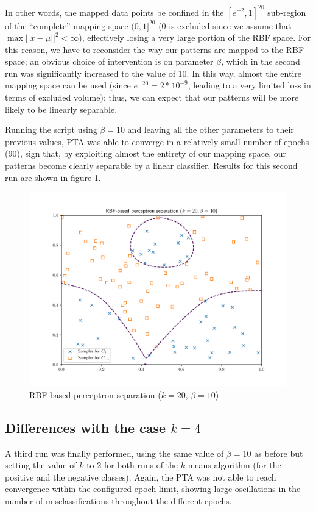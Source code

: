 \documentclass[letterpaper,headings=standardclasses]{scrartcl}
\begin{document}
In other words, the mapped data points be confined in the $[e^{-2}, 1]^{20}$ sub-region of the ``complete'' mapping space $(0,1]^{20}$ (0 is excluded since we assume that $\max{||x - \mu||^2} < \infty$), effectively losing a very large portion of the RBF space. For this reason, we have to reconsider the way our patterns are mapped to the RBF space; an obvious choice of intervention is on parameter $\beta$, which in the second run was significantly increased to the value of 10. In this way, almost the entire mapping space can be used (since $e^{-20} = 2 * 10^{-9}$, leading to a very limited loss in terms of excluded volume); thus, we can expect that our patterns will be more likely to be linearly separable.

Running the script using $\beta = 10$ and leaving all the other parameters to their previous values, PTA was able to converge in a relatively small number of epochs (90), sign that, by exploiting almost the entirety of our mapping space, our patterns become clearly separable by a linear classifier. Results for this second run are shown in figure \ref{sep_20_10}.

\begin{figure}[h]
    \centering
    \includegraphics[width=0.7\linewidth]{sep_20_10.pdf}
    \caption{RBF-based perceptron separation ($k = 20$, $\beta = 10$)}
    \label{sep_20_10}
\end{figure}

\subsection{Differences with the case $k = 4$}

A third run was finally performed, using the same value of $\beta = 10$ as before but setting the value of $k$ to 2 for both runs of the $k$-means algorithm (for the positive and the negative classes). Again, the PTA was not able to reach convergence within the configured epoch limit, showing large oscillations in the number of misclassifications throughout the different epochs.
\end{document}
